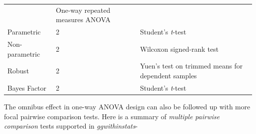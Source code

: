 \documentclass[]{article}
\begin{document}
\begin{longtable}[]{@{}lll@{}}
\begin{minipage}[t]{0.07\columnwidth}
\end{minipage} & \begin{minipage}[t]{0.59\columnwidth}\raggedright
One-way repeated measures ANOVA\strut
\end{minipage}\tabularnewline
\begin{minipage}[t]{0.26\columnwidth}\raggedright
Parametric\strut
\end{minipage} & \begin{minipage}[t]{0.07\columnwidth}\raggedright
2\strut
\end{minipage} & \begin{minipage}[t]{0.59\columnwidth}\raggedright
Student's \emph{t}-test\strut
\end{minipage}\tabularnewline
\begin{minipage}[t]{0.26\columnwidth}\raggedright
Non-parametric\strut
\end{minipage} & \begin{minipage}[t]{0.07\columnwidth}\raggedright
2\strut
\end{minipage} & \begin{minipage}[t]{0.59\columnwidth}\raggedright
Wilcoxon signed-rank test\strut
\end{minipage}\tabularnewline
\begin{minipage}[t]{0.26\columnwidth}\raggedright
Robust\strut
\end{minipage} & \begin{minipage}[t]{0.07\columnwidth}\raggedright
2\strut
\end{minipage} & \begin{minipage}[t]{0.59\columnwidth}\raggedright
Yuen's test on trimmed means for dependent samples\strut
\end{minipage}\tabularnewline
\begin{minipage}[t]{0.26\columnwidth}\raggedright
Bayes Factor\strut
\end{minipage} & \begin{minipage}[t]{0.07\columnwidth}\raggedright
2\strut
\end{minipage} & \begin{minipage}[t]{0.59\columnwidth}\raggedright
Student's \emph{t}-test\strut
\end{minipage}\tabularnewline
\bottomrule
\end{longtable}

The omnibus effect in one-way ANOVA design can also be followed up with
more focal pairwise comparison tests. Here is a summary of
\emph{multiple pairwise comparison} tests supported in
\emph{ggwithinstats}-
\end{document}
